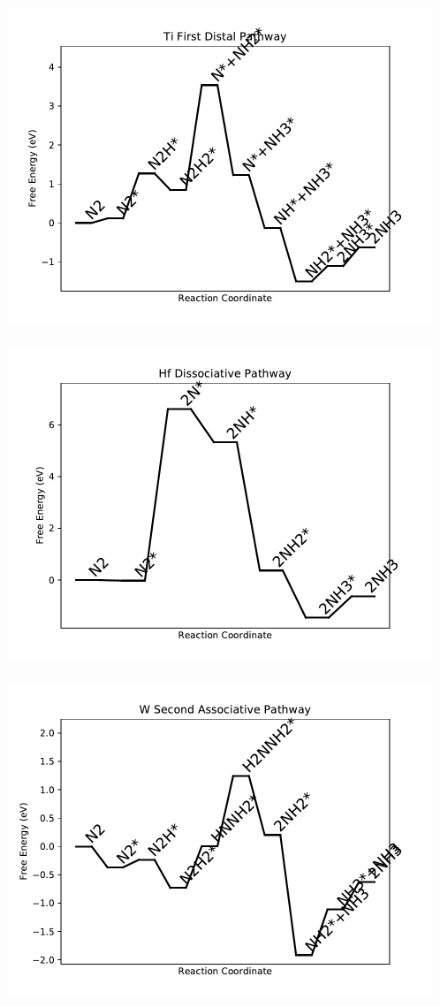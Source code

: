 \begin{figure}
\includegraphics[width=0.8\linewidth]{data/plots/Ti_distal_1.pdf}
\label{fig:Ti_distal_1}
\end{figure}

\begin{figure}
\includegraphics[width=0.8\linewidth]{data/plots/Hf_dissociative.pdf}
\label{fig:Hf_dissociative}
\end{figure}

\begin{figure}
\includegraphics[width=0.8\linewidth]{data/plots/W_associative_2.pdf}
\label{fig:W_associative_2}
\end{figure}

